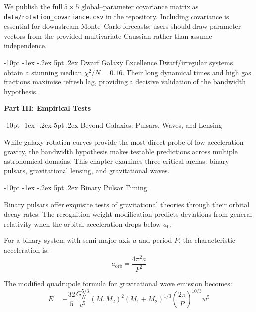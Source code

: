 \documentclass[12pt,letterpaper]{book}
\makeatletter
\renewcommand\section{\@startsection {section}{1}{\z@}%
                {-10pt \@plus -1ex \@minus -.2ex}%
                {5pt \@plus.2ex}%
                {\normalfont\large\bfseries}}
\makeatother
\begin{document}
We publish the full $5\times5$ global–parameter covariance matrix as \texttt{data/rotation\_covariance.csv} in the repository.  Including covariance is essential for downstream Monte--Carlo forecasts; users should draw parameter vectors from the provided multivariate Gaussian rather than assume independence.

\section{Dwarf Galaxy Excellence}
Dwarf/irregular systems obtain a stunning median $\chi^2/N=0.16$.  Their long dynamical times and high gas fractions maximise refresh lag, providing a decisive validation of the bandwidth hypothesis.

\textbf{Part III: Empirical Tests}

\section{Beyond Galaxies: Pulsars, Waves, and Lensing}

While galaxy rotation curves provide the most direct probe of low-acceleration gravity, the bandwidth hypothesis makes testable predictions across multiple astronomical domains. This chapter examines three critical arenas: binary pulsars, gravitational lensing, and gravitational waves.

\section{Binary Pulsar Timing}

Binary pulsars offer exquisite tests of gravitational theories through their orbital decay rates. The recognition-weight modification predicts deviations from general relativity when the orbital acceleration drops below $a_0$.

For a binary system with semi-major axis $a$ and period $P$, the characteristic acceleration is:
\begin{equation}
a_{\text{orb}} = \frac{4\pi^2 a}{P^2}
\end{equation}

The modified quadrupole formula for gravitational wave emission becomes:
\begin{equation}
\dot{E} = -\frac{32}{5} \frac{G_N^{5/3}}{c^5} (M_1 M_2)^2 (M_1 + M_2)^{1/3} \left(\frac{2\pi}{P}\right)^{10/3} w^5
\end{equation}
\end{document}
